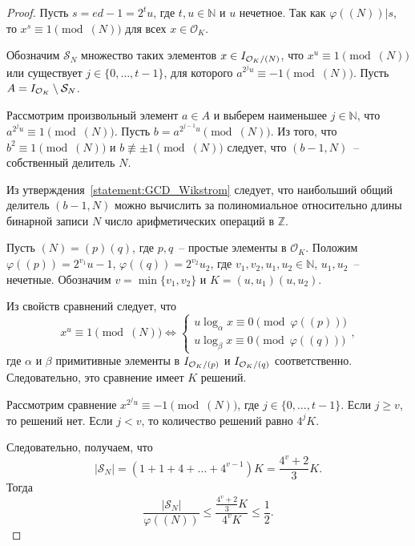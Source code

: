 \documentclass[_00_dissertation.tex]{subfiles}
\begin{document}
\begin{proof}
    Пусть $s = ed - 1 = 2^t u$, где $t, u \in \mathbb{N}$ и $u$ нечетное.
    Так как $\varphi((N)) | s$, то $x^s \equiv 1 \pmod{(N)}$ для всех $x \in \mathcal{O}_K$.
    
    Обозначим $\mathcal{S}_N$ множество таких элементов $x \in I_{\mathcal{O}_K / (N)}$, что $x^u \equiv 1 \pmod{(N)}$ или существует $j \in \{0, \dots, t-1\}$, для которого $a^{2^j u} \equiv -1 \pmod{(N)}$.
    Пусть $A = I_{\mathcal{O}_K} \setminus \mathcal{S}_N$.
    
    Рассмотрим произвольный элемент $a \in A$ и выберем наименьшее $j \in \mathbb{N}$, что $a^{2^j u} \equiv 1 \pmod{(N)}$.
    Пусть $b = a^{2^{j-1} u} \pmod{(N)}$.
    Из того, что $b^2 \equiv 1 \pmod{(N)}$ и $b \not\equiv \pm 1 \pmod{(N)}$ следует, что $(b - 1, N)$~-- собственный делитель $N$.

    Из утверждения~\ref{statement:GCD_Wikstrom} следует, что наибольший общий делитель $(b - 1, N)$ можно вычислить за полиномиальное относительно длины бинарной записи $N$ число арифметических операций в $\mathbb{Z}$.
    
    Пусть $(N) = (p)(q)$, где $p, q$~-- простые элементы в $\mathcal{O}_K$.
    Положим $\varphi((p)) = 2^{v_1} u-1$, $\varphi((q)) = 2^{v_2} u_2$, где $v_1, v_2, u_1, u_2 \in \mathbb{N}$, $u_1, u_2$~-- нечетные.
    Обозначим $v = \min\{v_1, v_2\}$ и $K = (u, u_1)(u, u_2)$.
    
    Из свойств сравнений следует, что
    \begin{equation*}
        x^u \equiv 1 \pmod{(N)}
        \Leftrightarrow
        \begin{cases}
            u \log_{\alpha} x \equiv 0 \pmod{\varphi((p))}\\
            u \log_{\beta} x \equiv 0 \pmod{\varphi((q))}
        \end{cases},
    \end{equation*}
    где $\alpha$ и $\beta$ примитивные элементы в $I_{\mathcal{O}_K / (p)}$ и $I_{\mathcal{O}_K / (q)}$ соответственно.
    Следовательно, это сравнение имеет $K$ решений.
    
    Рассмотрим сравнение $x^{2^j u} \equiv -1 \pmod{(N)}$, где $j \in \{0, \dots, t - 1\}$.
    Если $j \ge v$, то решений нет.
    Если $j < v$, то количество решений равно $4^j K$.
    
    Следовательно, получаем, что
    \begin{equation*}
        |\mathcal{S}_N| = \left(
            1 + 1 + 4 + \dots + 4^{v-1}
        \right)K = \frac{4^v + 2}{3}K.
    \end{equation*}
    Тогда
    \begin{equation*}
        \frac{|\mathcal{S}_N|}{\varphi((N))} \le \frac{\frac{4^v + 2}{3}K}{4^v K} \le \frac{1}{2}.
    \end{equation*}
\end{proof}
\end{document}
